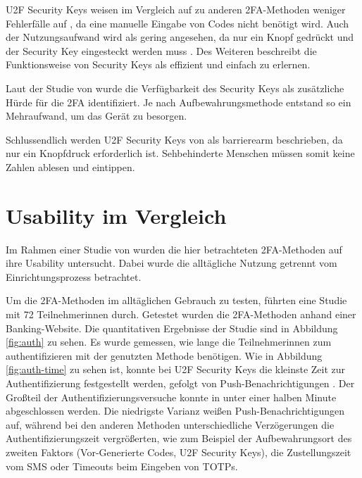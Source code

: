 \ac{U2F} Security Keys weisen im Vergleich auf zu anderen \ac{2FA}-Methoden weniger Fehlerfälle auf \parencite{langSecurityKeys2017}, da eine manuelle Eingabe von Codes nicht benötigt wird. Auch der Nutzungsaufwand wird als gering angesehen, da nur ein Knopf gedrückt und der Security Key eingesteckt werden muss \parencite{langSecurityKeys2017}. Des Weiteren beschreibt \textcite{langSecurityKeys2017} die Funktionsweise von Security Keys als effizient und einfach zu erlernen.

Laut der Studie von \textcite{reeseUsabilityStudy2019} wurde die Verfügbarkeit des Security Keys als zusätzliche Hürde für die \ac{2FA} identifiziert. Je nach Aufbewahrungsmethode entstand so ein Mehraufwand, um das Gerät zu besorgen.

Schlussendlich werden \ac{U2F} Security Keys von \textcite{langSecurityKeys2017} als barrierearm beschrieben, da nur ein Knopfdruck erforderlich ist. Sehbehinderte Menschen müssen somit keine Zahlen ablesen und eintippen.

\section{Usability im Vergleich}

Im Rahmen einer Studie von \textcite{reeseUsabilityStudy2019} wurden die hier betrachteten \ac{2FA}-Methoden auf ihre Usability untersucht. Dabei wurde die alltägliche Nutzung getrennt vom Einrichtungsprozess betrachtet.

Um die \ac{2FA}-Methoden im alltäglichen Gebrauch zu testen, führten \textcite{reeseUsabilityStudy2019} eine Studie mit 72 Teilnehmerinnen durch. Getestet wurden die \ac{2FA}-Methoden anhand einer Banking-Website. Die quantitativen Ergebnisse der Studie sind in Abbildung \ref{fig:auth} zu sehen. Es wurde gemessen, wie lange die Teilnehmerinnen zum authentifizieren mit der genutzten Methode benötigen. Wie in Abbildung \ref{fig:auth-time} zu sehen ist, konnte bei \ac{U2F} Security Keys die kleinste Zeit zur Authentifizierung festgestellt werden, gefolgt von Push-Benachrichtigungen \parencite{reeseUsabilityStudy2019}. Der Großteil der Authentifizierungsversuche konnte in unter einer halben Minute abgeschlossen werden. Die niedrigste Varianz weißen Push-Benachrichtigungen auf, während bei den anderen Methoden unterschiedliche Verzögerungen die Authentifizierungszeit vergrößerten, wie zum Beispiel der Aufbewahrungsort des zweiten Faktors (Vor-Generierte Codes, \ac{U2F} Security Keys), die Zustellungszeit vom SMS oder Timeouts beim Eingeben von \acp{TOTP}.

